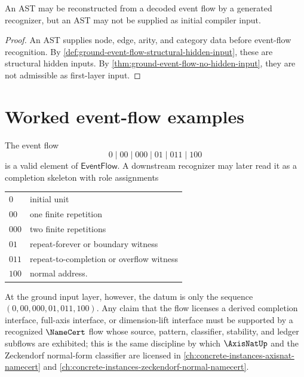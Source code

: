 \begin{corollary}
\label{cor:ground-event-flow-ast-not-input}
An AST may be reconstructed from a decoded event flow by a generated recognizer, but an AST may not be supplied as initial compiler input.
\end{corollary}

\begin{proof}
An AST supplies node, edge, arity, and category data before event-flow recognition. By \autoref{def:ground-event-flow-structural-hidden-input}, these are structural hidden inputs. By \autoref{thm:ground-event-flow-no-hidden-input}, they are not admissible as first-layer input.
\end{proof}

\section{Worked event-flow examples}
\label{sec:ground-event-flow-examples}

\begin{example}
\label{ex:ground-event-flow-completion-skeleton}
The event flow
$$
  0 \mid 00 \mid 000 \mid 01 \mid 011 \mid 100
$$
is a valid element of $\mathsf{EventFlow}$. A downstream recognizer may later read it as a completion skeleton with role assignments
\begin{center}
\begin{tabular}{ll}
  $0$    & initial unit \\
  $00$   & one finite repetition \\
  $000$  & two finite repetitions \\
  $01$   & repeat-forever or boundary witness \\
  $011$  & repeat-to-completion or overflow witness \\
  $100$  & normal address.
\end{tabular}
\end{center}
At the ground input layer, however, the datum is only the sequence $(0, 00, 000, 01, 011, 100)$. Any claim that the flow licenses a derived completion interface, full-axis interface, or dimension-lift interface must be supported by a recognized $\NameCert$ flow whose source, pattern, classifier, stability, and ledger subflows are exhibited; this is the same discipline by which $\AxisNatUp$ and the Zeckendorf normal-form classifier are licensed in \autoref{ch:concrete-instances-axisnat-namecert} and \autoref{ch:concrete-instances-zeckendorf-normal-namecert}.
\end{example}

